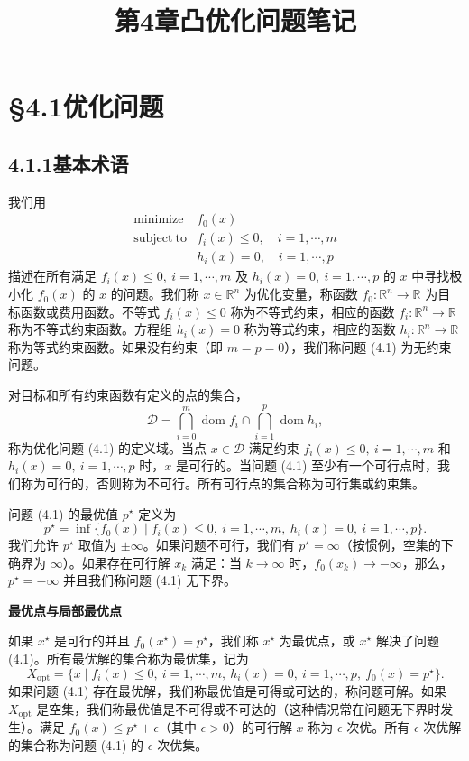 \documentclass[UTF8,12pt,a4paper,fontset=fandol]{ctexart}
\title{第4章\quad 凸优化问题笔记}
\author{}
\date{}
\begin{document}
\maketitle

\section*{§4.1\quad 优化问题}

\subsection*{4.1.1\quad 基本术语}

我们用
\begin{equation}
\begin{array}{ll}
\mathop{\mathrm{minimize}} & f_0(x)\\
\mathrm{subject\ to} & f_i(x)\leq 0,\quad i=1,\cdots,m\\
& h_i(x)=0,\quad i=1,\cdots,p
\end{array}
\tag{4.1}
\end{equation}
描述在所有满足 $f_i(x)\leq 0,\ i=1,\cdots,m$ 及 $h_i(x)=0,\ i=1,\cdots,p$ 的 $x$ 中寻找极小化 $f_0(x)$ 的 $x$ 的问题。我们称 $x\in\mathbb{R}^n$ 为优化变量，称函数 $f_0:\mathbb{R}^n\to\mathbb{R}$ 为目标函数或费用函数。不等式 $f_i(x)\leq 0$ 称为不等式约束，相应的函数 $f_i:\mathbb{R}^n\to\mathbb{R}$ 称为不等式约束函数。方程组 $h_i(x)=0$ 称为等式约束，相应的函数 $h_i:\mathbb{R}^n\to\mathbb{R}$ 称为等式约束函数。如果没有约束（即 $m=p=0$），我们称问题 (4.1) 为无约束问题。

对目标和所有约束函数有定义的点的集合，
\[
\mathcal{D}=\bigcap_{i=0}^{m}\operatorname{dom} f_i\cap\bigcap_{i=1}^{p}\operatorname{dom} h_i,
\]
称为优化问题 (4.1) 的定义域。当点 $x\in\mathcal{D}$ 满足约束 $f_i(x)\leq 0,\ i=1,\cdots,m$ 和 $h_i(x)=0,\ i=1,\cdots,p$ 时，$x$ 是可行的。当问题 (4.1) 至少有一个可行点时，我们称为可行的，否则称为不可行。所有可行点的集合称为可行集或约束集。

问题 (4.1) 的最优值 $p^\star$ 定义为
\[
p^\star=\inf\{f_0(x)\mid f_i(x)\leq 0,\ i=1,\cdots,m,\ h_i(x)=0,\ i=1,\cdots,p\}.
\]
我们允许 $p^\star$ 取值为 $\pm\infty$。如果问题不可行，我们有 $p^\star=\infty$（按惯例，空集的下确界为 $\infty$）。如果存在可行解 $x_k$ 满足：当 $k\to\infty$ 时，$f_0(x_k)\to-\infty$，那么，$p^\star=-\infty$ 并且我们称问题 (4.1) 无下界。

\noindent\textbf{最优点与局部最优点}

如果 $x^\star$ 是可行的并且 $f_0(x^\star)=p^\star$，我们称 $x^\star$ 为最优点，或 $x^\star$ 解决了问题 (4.1)。所有最优解的集合称为最优集，记为
\[
X_{\mathrm{opt}}=\{x\mid f_i(x)\leq 0,\ i=1,\cdots,m,\ h_i(x)=0,\ i=1,\cdots,p,\ f_0(x)=p^\star\}.
\]
如果问题 (4.1) 存在最优解，我们称最优值是可得或可达的，称问题可解。如果 $X_{\mathrm{opt}}$ 是空集，我们称最优值是不可得或不可达的（这种情况常在问题无下界时发生）。满足 $f_0(x)\leq p^\star+\epsilon$（其中 $\epsilon>0$）的可行解 $x$ 称为 $\epsilon$-次优。所有 $\epsilon$-次优解的集合称为问题 (4.1) 的 $\epsilon$-次优集。
\end{document}
